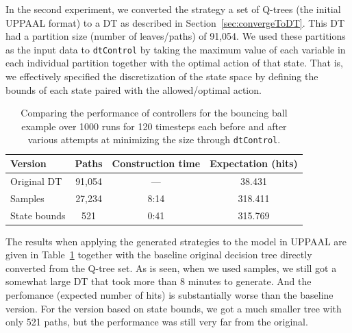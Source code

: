 \documentclass{article}
\begin{document}
In the second experiment, we converted the strategy a set of Q-trees (the
initial UPPAAL format) to a DT as described in Section~\ref{sec:convergeToDT}.
This DT had a partition size (number of leaves/paths) of 91,054. We used these
partitions as the input data to \texttt{dtControl} by taking the maximum value
of each variable in each individual partition together with the optimal action
of that state. That is, we effectively specified the discretization of the state
space by defining the bounds of each state paired with the allowed/optimal
action.

\begin{table}[ht]
    \centering
    \caption{%
        Comparing the performance of controllers for the bouncing ball example
        over 1000 runs for 120 timesteps each before and after various attempts
        at minimizing the size through \texttt{dtControl}.  
    }\label{tab:dtcontrolTable}
    \begin{tabular}[t]{lccc}
        \toprule
        Version & Paths & Construction time & Expectation (hits) \\
        \midrule
        Original DT & 91,054 & --- & 38.431 \\
        Samples & 27,234 & 8:14 & 318.411 \\
        State bounds & 521 & 0:41 & 315.769 \\
        \bottomrule
    \end{tabular}
\end{table}


The results when applying the generated strategies to the model in UPPAAL are
given in Table~\ref{tab:dtcontrolTable} together with the baseline original
decision tree directly converted from the Q-tree set. As is seen, when we used
samples, we still got a somewhat large DT that took more than 8 minutes to
generate. And the perfomance (expected number of hits) is substantially worse
than the baseline version. For the version based on state bounds, we got a much
smaller tree with only 521 paths, but the performance was still very far from
the original.
\end{document}
